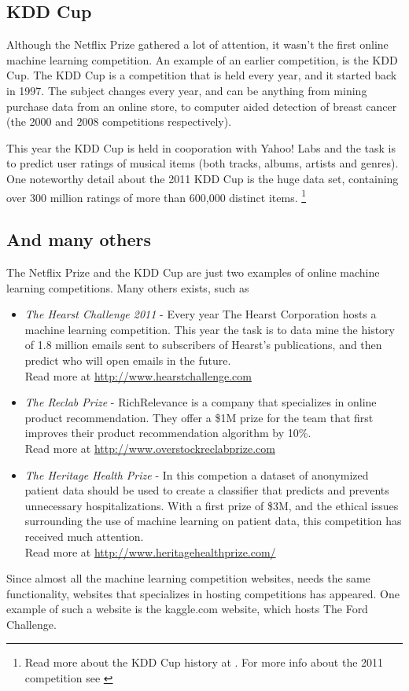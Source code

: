 \subsection{KDD Cup}
Although the Netflix Prize gathered a lot of attention, it wasn't the first online machine learning competition. An example of an earlier competition, is the KDD Cup. The KDD Cup is a competition that is held every year, and it started back in 1997. The subject changes every year, and can be anything from mining purchase data from an online store, to computer aided detection of breast cancer (the 2000 and 2008 competitions respectively).\par
This year the KDD Cup is held in cooporation with Yahoo! Labs and the task is to predict user ratings of musical items (both tracks, albums, artists and genres). One noteworthy detail about the 2011 KDD Cup is the huge data set, containing over 300 million ratings of more than 600,000 distinct items. \footnote{Read more about the KDD Cup history at \citet{kdd_cup_center}. For more info about the 2011 competition see \citet{kdd_cup_2011}}

\subsection{And many others}
The Netflix Prize and the KDD Cup are just two examples of online machine learning competitions. Many others exists, such as
\begin{itemize}
    \item \emph{The Hearst Challenge 2011} - Every year The Hearst Corporation hosts a machine learning competition. This year the task is to data mine the history of 1.8 million emails sent to subscribers of Hearst's publications, and then predict who will open emails in the future. \\
        Read more at \url{http://www.hearstchallenge.com}
    \item \emph{The Reclab Prize} - RichRelevance is a company that specializes in online product recommendation. They offer a \$1M prize for the team that first improves their product recommendation algorithm by 10\%. \\
        Read more at \url{http://www.overstockreclabprize.com}
    \item \emph{The Heritage Health Prize} - In this competion a dataset of anonymized patient data should be used to create a classifier that predicts and prevents unnecessary hospitalizations. With a first prize of \$3M, and the ethical issues surrounding the use of machine learning on patient data, this competition has received much attention.  \\
        Read more at \url{http://www.heritagehealthprize.com/}
\end{itemize}
Since almost all the machine learning competition websites, needs the same functionality, websites that specializes in hosting competitions has appeared. One example of such a website is the kaggle.com website, which hosts The Ford Challenge.

